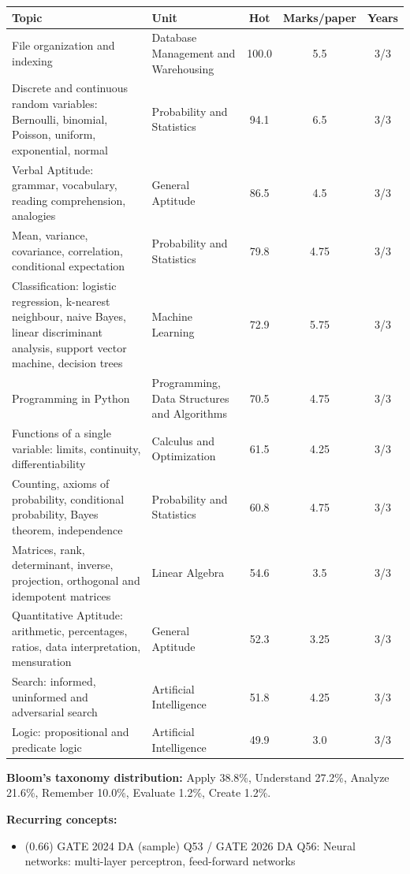 {\small\begin{longtable}{@{}p{6.4cm}p{3.6cm}ccc@{}}\toprule \textbf{Topic} & \textbf{Unit} & \textbf{Hot} & \textbf{Marks/paper} & \textbf{Years}\\\midrule\endhead
File organization and indexing & Database Management and Warehousing & 100.0 & 5.5 & 3/3\\
Discrete and continuous random variables: Bernoulli, binomial, Poisson, uniform, exponential, normal & Probability and Statistics & 94.1 & 6.5 & 3/3\\
Verbal Aptitude: grammar, vocabulary, reading comprehension, analogies & General Aptitude & 86.5 & 4.5 & 3/3\\
Mean, variance, covariance, correlation, conditional expectation & Probability and Statistics & 79.8 & 4.75 & 3/3\\
Classification: logistic regression, k-nearest neighbour, naive Bayes, linear discriminant analysis, support vector machine, decision trees & Machine Learning & 72.9 & 5.75 & 3/3\\
Programming in Python & Programming, Data Structures and Algorithms & 70.5 & 4.75 & 3/3\\
Functions of a single variable: limits, continuity, differentiability & Calculus and Optimization & 61.5 & 4.25 & 3/3\\
Counting, axioms of probability, conditional probability, Bayes theorem, independence & Probability and Statistics & 60.8 & 4.75 & 3/3\\
Matrices, rank, determinant, inverse, projection, orthogonal and idempotent matrices & Linear Algebra & 54.6 & 3.5 & 3/3\\
Quantitative Aptitude: arithmetic, percentages, ratios, data interpretation, mensuration & General Aptitude & 52.3 & 3.25 & 3/3\\
Search: informed, uninformed and adversarial search & Artificial Intelligence & 51.8 & 4.25 & 3/3\\
Logic: propositional and predicate logic & Artificial Intelligence & 49.9 & 3.0 & 3/3\\
\bottomrule\end{longtable}}
\noindent\textbf{Bloom's taxonomy distribution:} Apply 38.8\%, Understand 27.2\%, Analyze 21.6\%, Remember 10.0\%, Evaluate 1.2\%, Create 1.2\%.\par
\smallskip\noindent\textbf{Recurring concepts:}\begin{itemize}[leftmargin=1.4em,itemsep=1pt]
\item (0.66) GATE 2024 DA (sample) Q53 / GATE 2026 DA Q56: Neural networks: multi-layer perceptron, feed-forward networks
\end{itemize}

